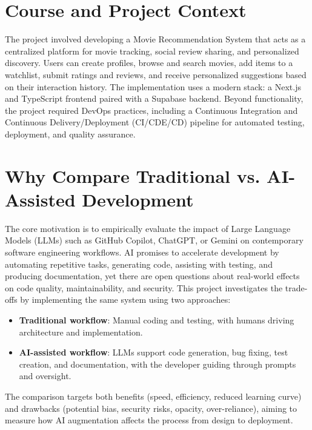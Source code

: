 \documentclass[a4paper,12pt]{report}
\begin{document}
\section{Course and Project Context}
The project involved developing a Movie Recommendation System that acts as a centralized platform for movie tracking, social review sharing, and personalized discovery. Users can create profiles, browse and search movies, add items to a watchlist, submit ratings and reviews, and receive personalized suggestions based on their interaction history. The implementation uses a modern stack: a Next.js and TypeScript frontend paired with a Supabase backend. Beyond functionality, the project required DevOps practices, including a Continuous Integration and Continuous Delivery/Deployment (CI/CDE/CD) pipeline for automated testing, deployment, and quality assurance.

\section{Why Compare Traditional vs. AI-Assisted Development}
The core motivation is to empirically evaluate the impact of Large Language Models (LLMs) such as GitHub Copilot, ChatGPT, or Gemini on contemporary software engineering workflows. AI promises to accelerate development by automating repetitive tasks, generating code, assisting with testing, and producing documentation, yet there are open questions about real-world effects on code quality, maintainability, and security. This project investigates the trade-offs by implementing the same system using two approaches:
\begin{itemize}
  \item \textbf{Traditional workflow}: Manual coding and testing, with humans driving architecture and implementation.
  \item \textbf{AI-assisted workflow}: LLMs support code generation, bug fixing, test creation, and documentation, with the developer guiding through prompts and oversight.
\end{itemize}
The comparison targets both benefits (speed, efficiency, reduced learning curve) and drawbacks (potential bias, security risks, opacity, over-reliance), aiming to measure how AI augmentation affects the process from design to deployment.
\end{document}
